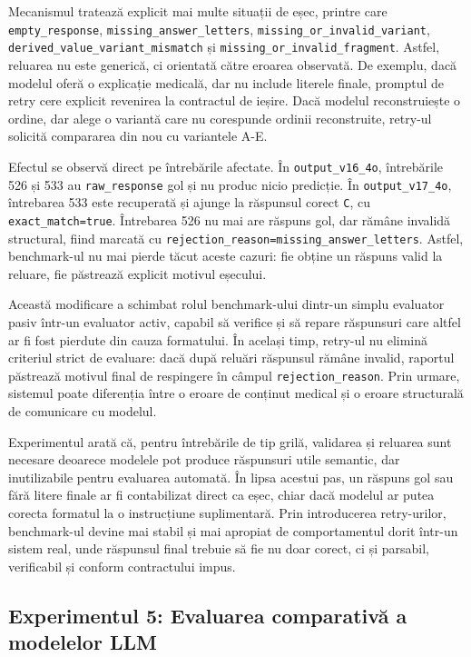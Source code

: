 \documentclass[12pt, a4paper, oneside, romanian]{teza-upb}
\begin{document}
Mecanismul tratează explicit mai multe situații de eșec, printre care \texttt{empty\_response}, \texttt{missing\_answer\_letters}, \texttt{missing\_or\_invalid\_variant}, \texttt{derived\_value\_variant\_mismatch} și \texttt{missing\_or\_invalid\_fragment}. Astfel, reluarea nu este generică, ci orientată către eroarea observată. De exemplu, dacă modelul oferă o explicație medicală, dar nu include literele finale, promptul de retry cere explicit revenirea la contractul de ieșire. Dacă modelul reconstruiește o ordine, dar alege o variantă care nu corespunde ordinii reconstruite, retry-ul solicită compararea din nou cu variantele A-E.

Efectul se observă direct pe întrebările afectate. În \texttt{output\_v16\_4o}, întrebările 526 și 533 au \texttt{raw\_response} gol și nu produc nicio predicție. În \texttt{output\_v17\_4o}, întrebarea 533 este recuperată și ajunge la răspunsul corect \texttt{C}, cu \texttt{exact\_match=true}. Întrebarea 526 nu mai are răspuns gol, dar rămâne invalidă structural, fiind marcată cu \texttt{rejection\_reason=missing\_answer\_letters}. Astfel, benchmark-ul nu mai pierde tăcut aceste cazuri: fie obține un răspuns valid la reluare, fie păstrează explicit motivul eșecului.

Această modificare a schimbat rolul benchmark-ului dintr-un simplu evaluator pasiv într-un evaluator activ, capabil să verifice și să repare răspunsuri care altfel ar fi fost pierdute din cauza formatului. În același timp, retry-ul nu elimină criteriul strict de evaluare: dacă după reluări răspunsul rămâne invalid, raportul păstrează motivul final de respingere în câmpul \texttt{rejection\_reason}. Prin urmare, sistemul poate diferenția între o eroare de conținut medical și o eroare structurală de comunicare cu modelul.

Experimentul arată că, pentru întrebările de tip grilă, validarea și reluarea sunt necesare deoarece modelele pot produce răspunsuri utile semantic, dar inutilizabile pentru evaluarea automată. În lipsa acestui pas, un răspuns gol sau fără litere finale ar fi contabilizat direct ca eșec, chiar dacă modelul ar putea corecta formatul la o instrucțiune suplimentară. Prin introducerea retry-urilor, benchmark-ul devine mai stabil și mai apropiat de comportamentul dorit într-un sistem real, unde răspunsul final trebuie să fie nu doar corect, ci și parsabil, verificabil și conform contractului impus.

\subsection{Experimentul 5: Evaluarea comparativă a modelelor LLM}
\end{document}

